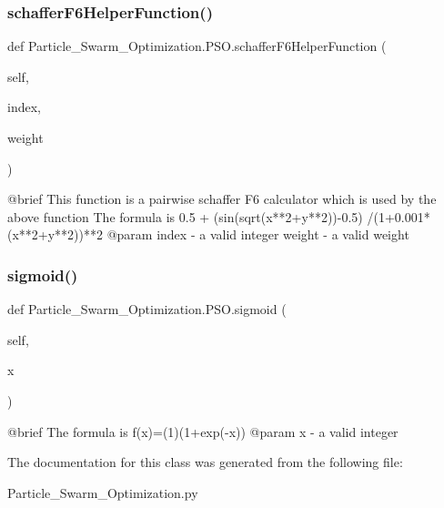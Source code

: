 \subsubsection{\texorpdfstring{schaffer\+F6\+Helper\+Function()}{schafferF6HelperFunction()}}
{\footnotesize\ttfamily def Particle\+\_\+\+Swarm\+\_\+\+Optimization.\+P\+S\+O.\+schaffer\+F6\+Helper\+Function (\begin{DoxyParamCaption}\item[{}]{self,  }\item[{}]{index,  }\item[{}]{weight }\end{DoxyParamCaption})}

\begin{DoxyVerb}@brief  This function is a pairwise schaffer F6 calculator which is used by the above function
    The formula is 0.5 + (sin(sqrt(x**2+y**2))-0.5) /(1+0.001*(x**2+y**2))**2
@param index - a valid integer
   weight - a valid weight\end{DoxyVerb}
 \hypertarget{class_particle___swarm___optimization_1_1_p_s_o_a8cfda07a7b320a55112993aea3a1f921}{}\label{class_particle___swarm___optimization_1_1_p_s_o_a8cfda07a7b320a55112993aea3a1f921} 
\subsubsection{\texorpdfstring{sigmoid()}{sigmoid()}}
{\footnotesize\ttfamily def Particle\+\_\+\+Swarm\+\_\+\+Optimization.\+P\+S\+O.\+sigmoid (\begin{DoxyParamCaption}\item[{}]{self,  }\item[{}]{x }\end{DoxyParamCaption})}

\begin{DoxyVerb}@brief The formula is  f(x)=(1)(1+exp(-x))
@param x - a valid integer\end{DoxyVerb}
 

The documentation for this class was generated from the following file\+:\begin{DoxyCompactItemize}
\item 
Particle\+\_\+\+Swarm\+\_\+\+Optimization.\+py\end{DoxyCompactItemize}
